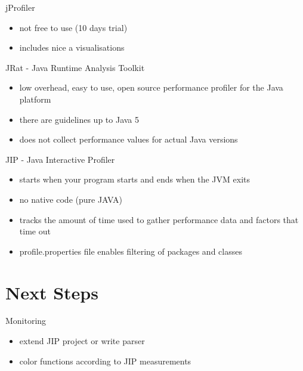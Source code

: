 \documentclass[11pt,aspectratio=169]{beamer}
\begin{document}
\begin{frame}{jProfiler}
  \begin{itemize}
    \item not free to use (10 days trial)
    \item includes nice a visualisations
  \end{itemize}
\end{frame}

\begin{frame}{JRat - Java Runtime Analysis Toolkit}
  \begin{itemize}
    \item low overhead, easy to use, open source performance profiler for the Java platform
    \item there are guidelines up to Java 5
    \item does not collect performance values for actual Java versions
  \end{itemize}
  
\end{frame}

\begin{frame}{JIP - Java Interactive Profiler}
  \begin{itemize}
    \item starts when your program starts and ends when the JVM exits
    \item no native code (pure JAVA)
    \item tracks the amount of time used to gather performance data and factors that time out
    \item profile.properties file enables filtering of packages and classes
  \end{itemize}
  
\end{frame}

\section{Next Steps}

\begin{frame}{Monitoring}
  \begin{itemize}
    \item extend JIP project or write parser
    \item color functions according to JIP measurements
  \end{itemize}
\end{frame}
\end{document}
